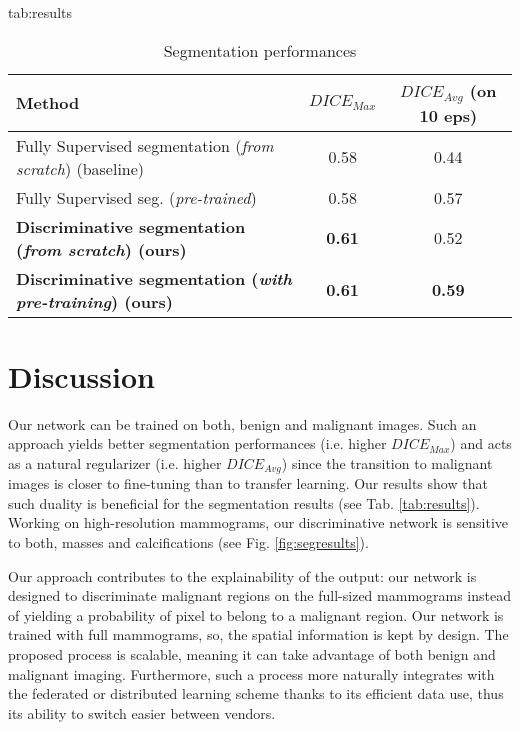 \documentclass{midl} %
\begin{document}
{
\begin{table}[htbp]
\floatconts
  {tab:results}%
  {\caption{Segmentation performances}}%
  {\vspace{-0.2mm}\begin{tabular}{l|c|c}
  \bfseries Method  & \bfseries $DICE_{Max}$ & \bfseries $DICE_{Avg}$ (on 10 eps) \\ \hline
  \scriptsize Fully Supervised segmentation (\textit{from scratch}) (baseline) & 0.58 & 0.44\\
  \scriptsize Fully Supervised seg. (\textit{pre-trained}) \cite{Zhou2019a} & 0.58 & 0.57\\
  \scriptsize \textbf{Discriminative segmentation (\textit{from scratch}) (ours)} & \textbf{0.61}  & 0.52 \\
  \scriptsize \textbf{Discriminative segmentation (\textit{with pre-training}) (ours)} & \textbf{0.61} & \textbf{0.59} \\
  \end{tabular}}
\end{table}
}

\section{Discussion}

Our network can be trained on both, benign and malignant images. Such an approach yields better segmentation performances (i.e. higher $DICE_{Max}$) and acts as a natural regularizer (i.e. higher $DICE_{Avg}$) since the transition to malignant images is closer to fine-tuning than to transfer learning. Our results show that such duality is beneficial for the segmentation results (see Tab. \ref{tab:results}). Working on high-resolution mammograms, our discriminative network is sensitive to both, masses and calcifications (see Fig. \ref{fig:segresults}).

Our approach contributes to the explainability of the output: our network is designed to discriminate malignant regions on the full-sized mammograms instead of yielding a probability of pixel to belong to a malignant region. Our network is trained with full mammograms, so, the spatial information is kept by design. The proposed process is scalable, meaning it can take advantage of both benign and malignant imaging. Furthermore, such a process more naturally integrates with the federated or distributed learning scheme thanks to its efficient data use, thus its ability to switch easier between vendors.
\end{document}
